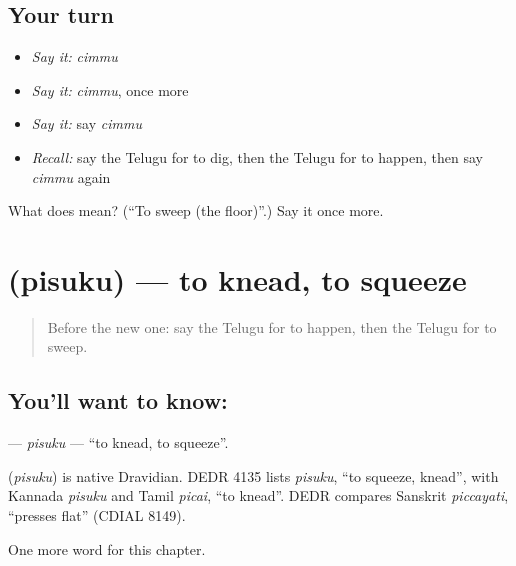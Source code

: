\subsection*{Your turn}
\begin{itemize}
\raggedright
  \item \emph{Say it:} \emph{cimmu}
  \item \emph{Say it:} \emph{cimmu}, once more
  \item \emph{Say it:} say \emph{cimmu}
  \item \emph{Recall:} say the Telugu for to dig, then the Telugu for to happen, then say \emph{cimmu} again
\end{itemize}

\begin{tcolorbox}[breakable,colback=teal!4,colframe=teal!35!black,title={Before you move on}]
What does  mean? (\textquotedblleft{}To sweep (the floor)\textquotedblright{}.) Say it once more.
\end{tcolorbox}
\section[\texorpdfstring{\te{పిసుకు} (pisuku)}{పిసుకు (pisuku)}]{ (pisuku) — to knead, to squeeze}

\label{lesson:TE-C284-pisuku}



\begin{quote}
Before the new one: say the Telugu for to happen, then the Telugu for to sweep.
\end{quote}

\subsection*{You'll want to know: }
\textbf{} — \emph{pisuku} — \textquotedblleft{}to knead, to squeeze\textquotedblright{}.

\begin{cousinweb}
\textbf{} (\emph{pisuku}) is native Dravidian. DEDR 4135 lists \emph{pisuku}, \textquotedblleft{}to squeeze, knead\textquotedblright{}, with Kannada \emph{pisuku} and Tamil \emph{picai}, \textquotedblleft{}to knead\textquotedblright{}. DEDR compares Sanskrit \emph{piccayati}, \textquotedblleft{}presses flat\textquotedblright{} (CDIAL 8149).
\end{cousinweb}

\begin{grammarlens}[title={What you've built}]
One more word for this chapter.
\end{grammarlens}

